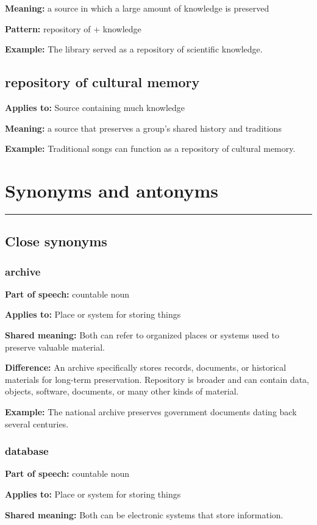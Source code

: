 \documentclass[11pt]{article}
\newcommand{\sectionrule}{\par\vspace{-0.5em}\noindent\textcolor{Accent}{\rule{\linewidth}{0.6pt}}\par}
\begin{document}
\textbf{Meaning:} a source in which a large amount of knowledge is preserved

\textbf{Pattern:} repository of + knowledge

\textbf{Example:} The library served as a repository of scientific knowledge.

\subsection{repository of cultural memory}
\textbf{Applies to:} Source containing much knowledge

\textbf{Meaning:} a source that preserves a group's shared history and traditions

\textbf{Example:} Traditional songs can function as a repository of cultural memory.

\section{Synonyms and antonyms}
\sectionrule
\subsection{Close synonyms}
\subsubsection{archive}
\textbf{Part of speech:} countable noun

\textbf{Applies to:} Place or system for storing things

\textbf{Shared meaning:} Both can refer to organized places or systems used to preserve valuable material.

\textbf{Difference:} An archive specifically stores records, documents, or historical materials for long-term preservation. Repository is broader and can contain data, objects, software, documents, or many other kinds of material.

\textbf{Example:} The national archive preserves government documents dating back several centuries.

\subsubsection{database}
\textbf{Part of speech:} countable noun

\textbf{Applies to:} Place or system for storing things

\textbf{Shared meaning:} Both can be electronic systems that store information.
\end{document}
